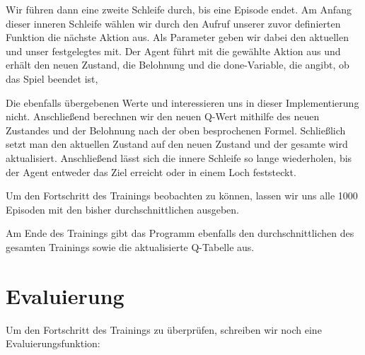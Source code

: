 Wir führen dann eine zweite Schleife durch, bis eine Episode endet. Am Anfang dieser inneren Schleife wählen wir durch den Aufruf unserer zuvor definierten Funktion  die nächste Aktion aus. Als Parameter geben wir dabei den aktuellen  und unser festgelegtes  mit. Der Agent führt mit  die gewählte Aktion aus und erhält den neuen Zustand, die Belohnung und die done-Variable, die angibt, ob das Spiel beendet ist,

Die ebenfalls übergebenen Werte  und  interessieren uns in dieser Implementierung nicht. Anschließend berechnen wir den neuen Q-Wert mithilfe des neuen Zustandes und der Belohnung nach der oben besprochenen Formel. Schließlich setzt man den aktuellen Zustand auf den neuen Zustand und der gesamte  wird aktualisiert. Anschließend lässt sich die innere Schleife so lange wiederholen, bis der Agent entweder das Ziel erreicht oder in einem Loch feststeckt.

Um den Fortschritt des Trainings beobachten zu können, lassen wir uns alle 1000 Episoden mit  den bisher durchschnittlichen  ausgeben.

Am Ende des Trainings gibt das Programm ebenfalls den durchschnittlichen  des gesamten Trainings sowie die aktualisierte Q-Tabelle aus.

\section{Evaluierung}

Um den Fortschritt des Trainings zu überprüfen, schreiben wir noch eine Evaluierungsfunktion:

\medskip




\PYTHON{}





\PYTHON{}


